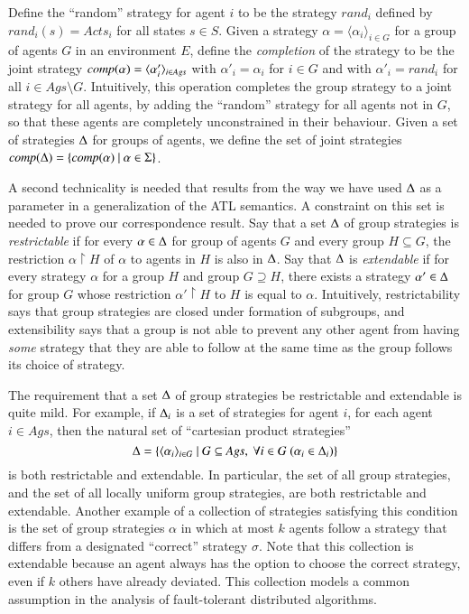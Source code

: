 \documentclass[a4wide]{article}
\theoremstyle{examplesty}
\newcommand{\strat}{\sigma}
\newcommand{\Ags}{\mathit{Ags}}
\newcommand{\Env}{E}
\newcommand{\restrict}{\upharpoonright}
\newcommand{\Acts}{\mathit{Acts}}
\newcommand{\sgy}{\alpha}
\newcommand{\Strats}{\Sigma}
\begin{document}
\newcommand{\rand}{\mathit{rand}} 
Define the ``random'' strategy  for agent $i$ to be the strategy $\rand_i$ defined by $\rand_i(s) = \Acts_i$ for all states $s\in S$. 
Given a strategy $\sgy =\langle \sgy_i\rangle_{i\in G}$ for a group of agents $G$ in an environment $\Env$, 
define the \emph{completion} of the strategy to be the joint strategy $\compl{\sgy}= 
\langle \sgy'_i\rangle_{i\in \Ags}
$ with $\sgy'_i = \sgy_i$ for $i\in G$ 
and with $\sgy'_i = \rand_i$ for all $i\in \Ags\setminus G$. 
Intuitively, this operation completes the 
group strategy to a joint strategy for all agents, by adding the ``random'' strategy for all agents not in $G$, 
so that these agents are completely unconstrained in their behaviour. 
Given a set of  strategies $\Delta$ for groups of agents, 
we define the set of joint strategies $\compl{\GStrats} = \{\compl{\sgy}~|~\sgy\in \Strats\}$. 

A second technicality is needed that results from the way we have used $\Delta$ as a parameter in a generalization
of the ATL semantics. A constraint on this set is needed to prove our correspondence result. 
Say that a set $\Delta$ of group strategies is {\em restrictable} if
for every $\sgy\in \GStrats$ 
for group of agents $G$ 
and every group $H\subseteq G$, the restriction $\sgy\restrict H$ of $\sgy$ to agents in $H$ is also in $\Delta$. 
Say that $\Delta$ is \emph{extendable} if for every strategy $\sgy$ for a group $H$ and group $G\supseteq H$, 
there exists a strategy $\sgy'\in \GStrats$  for group $G$ whose restriction $\sgy'\restrict H$ to
$H$ is equal to $\sgy$. 
Intuitively, restrictability says that group strategies are closed under formation of subgroups, 
and extensibility says that  a group is not able to prevent any other agent from having
\emph{some} strategy that they are able to follow at the same time as the group 
follows its choice of strategy. 

The requirement that a set $\Delta$ of group strategies 
be 
restrictable 
 and extendable is  quite mild. 
For example, if $\Delta_i$ is a set of strategies for agent $i$, for each agent $i \in \Ags$, then 
the natural set of ``cartesian product strategies'' 
$$\GStrats = \{ \langle \alpha_i\rangle_{i\in G}~|~G\subseteq \Ags,~\forall i\in G~(\alpha_i \in \GStrats_i)\}$$ 
is both restrictable and extendable. 
In particular, the set of 
all group strategies, and the set of all locally uniform group strategies, are both restrictable 
and extendable. 
Another example of a collection of strategies satisfying this condition is the set of 
group strategies $\alpha$ in which at most $k$ agents follow a strategy that differs 
from a designated ``correct'' strategy $\strat$. Note that this collection is extendable because
an agent always has the option to choose the correct strategy, even if $k$ others have already deviated. 
This collection models a common assumption in the analysis of fault-tolerant distributed algorithms. 
\end{document}
